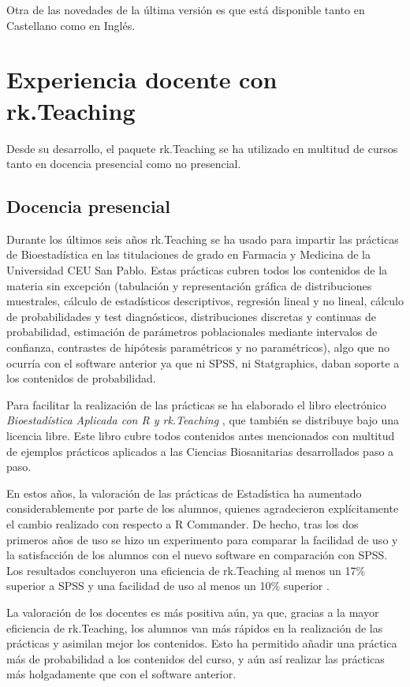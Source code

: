 \documentclass[a4paper,10pt,twoside]{article}
\newcommand{\rkteaching}{\textsf{rk.Teaching}}
\newcommand{\spss}{\textsf{SPSS}}
\newcommand{\statgraphics}{\textsf{Statgraphics}}
\newcommand{\rcommander}{\textsf{R Commander}}
\begin{document}
Otra de las novedades de la última versión es que está disponible tanto en Castellano como en Inglés. 

\section{Experiencia docente con \rkteaching}
\label{s:docencia}
Desde su desarrollo, el paquete \rkteaching{} se ha utilizado en multitud de cursos tanto en docencia presencial como no
presencial. 

\subsection{Docencia presencial}
Durante los últimos seis años \rkteaching{} se ha usado para impartir las prácticas de Bioestadística en las
titulaciones de grado en Farmacia y Medicina de la Universidad CEU San Pablo.
Estas prácticas cubren todos los contenidos de la materia sin excepción (tabulación y representación gráfica de
distribuciones muestrales, cálculo de estadísticos descriptivos, regresión lineal y no lineal, cálculo de probabilidades
y test diagnósticos, distribuciones discretas y continuas de probabilidad, estimación de parámetros poblacionales
mediante intervalos de confianza, contrastes de hipótesis paramétricos y no paramétricos), algo que no ocurría con el
software anterior ya que ni \spss{}, ni \statgraphics{}, daban soporte a los contenidos de probabilidad.

Para facilitar la realización de las prácticas se ha elaborado el libro electrónico \emph{Bioestadística Aplicada
con R y rk.Teaching} \cite{sanchez2014bioestadistica}, que también se distribuye bajo una licencia libre. 
Este libro cubre todos contenidos antes mencionados con multitud de ejemplos prácticos aplicados a las Ciencias
Biosanitarias desarrollados paso a paso.

En estos años, la valoración de las prácticas de Estadística ha aumentado considerablemente por parte de los alumnos,
quienes agradecieron explícitamente el cambio realizado con respecto a \rcommander{}. 
De hecho, tras los dos primeros años de uso se hizo un experimento para comparar la facilidad de uso y la satisfacción
de los alumnos con el nuevo software en comparación con \spss{}.
Los resultados concluyeron una eficiencia de \rkteaching{} al menos un 17\% superior a \spss{} y una facilidad de uso al
menos un 10\% superior \cite{sanchez2011rkteaching}.

La valoración de los docentes es más positiva aún, ya que, gracias a la mayor eficiencia de \rkteaching{}, los
alumnos van más rápidos en la realización de las prácticas y asimilan mejor los contenidos. 
Esto ha permitido añadir una práctica más de probabilidad a los contenidos del curso, y aún así realizar las prácticas
más holgadamente que con el software anterior.
\end{document}
